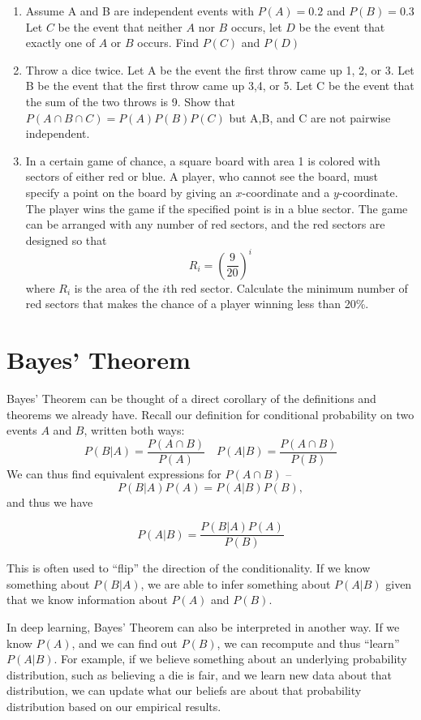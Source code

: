 \documentclass[../main.tex]{subfiles}
\begin{document}
{\begin{enumerate}
	\item Assume A and B are independent events with $P(A) = 0.2$ and $P(B) = 0.3$
	Let $C$ be the event that neither $A$ nor $B$ occurs, let $D$ be the event that
	exactly one of $A$ or $B$ occurs. Find $P(C)$ and $P(D)$
	
	\item Throw a dice twice. Let A be the event the first throw came up 1, 2, or 3. Let
	B be the event that the first throw came up 3,4, or 5. Let C be the event that
	the sum of the two throws is 9. Show that $P(A \cap B \cap C) = P(A)P(B)P(C)$
	but A,B, and C are not pairwise independent.
	
	\item In a certain game of chance, a square board with area 1 is colored with sectors
	of either red or blue. A player, who cannot see the board, must specify a
	point on the board by giving an $x$-coordinate and a $y$-coordinate. The
	player wins the game if the specified point is in a blue sector. The game can
	be arranged with any number of red sectors, and the red sectors are designed
	so that
	$$R_i = \left( \dfrac{9}{20} \right) ^ i$$
	where $R_i$ is the area of the $i$th red sector.
	Calculate the minimum number of red sectors that makes the chance of a
	player winning less than 20\%.
\end{enumerate}
}

\section{Bayes' Theorem}
Bayes' Theorem can be thought of a direct corollary of the definitions and theorems we already have. Recall our definition for conditional probability on two events $A$ and $B$, written both ways:
\[
	P(B|A) = \frac{P(A\cap B)}{P(A)} \quad P(A|B) = \frac{P(A\cap B)}{P(B)}
\]
We can thus find equivalent expressions for $P(A \cap B)$ --
\[
	P(B|A) P(A) = P(A|B) P(B),
\]
and thus we have
\begin{theorem}
\[P(A|B) = \frac{P(B|A) P(A)}{P(B)} \]
\end{theorem}
This is often used to ``flip'' the direction of the conditionality. If we know something about $P(B|A)$, we are able to infer something about $P(A|B)$ given that we know information about $P(A)$ and $P(B)$. 

In deep learning, Bayes' Theorem can also be interpreted in another way. If we know $P(A)$, and we can find out $P(B)$, we can recompute and thus ``learn'' $P(A|B)$. For example, if we believe something about an underlying probability distribution, such as believing a die is fair,  and we learn new data about that distribution, we can update what our beliefs are about that probability distribution based on our empirical results. 
\end{document}
